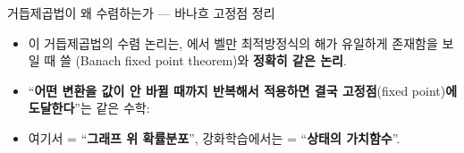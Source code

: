 \begin{frame}{거듭제곱법이 왜 수렴하는가 --- 바나흐 고정점 정리}
  \begin{itemize}
    \item 이 거듭제곱법의 수렴 논리는, 에서
      벨만 최적방정식의 해가 유일하게 존재함을 보일 때 쓸
      (Banach fixed point theorem)와
      \textbf{정확히 같은 논리}.
    \item ``\textbf{어떤 변환을 값이 안 바뀔 때까지 반복해서 적용하면
      결국 고정점}(fixed point)\textbf{에 도달한다}''는 같은 수학:
    \item 여기서 = ``\textbf{그래프 위 확률분포}'',
      강화학습에서는 = ``\textbf{상태의 가치함수}''.
  \end{itemize}
\end{frame}
